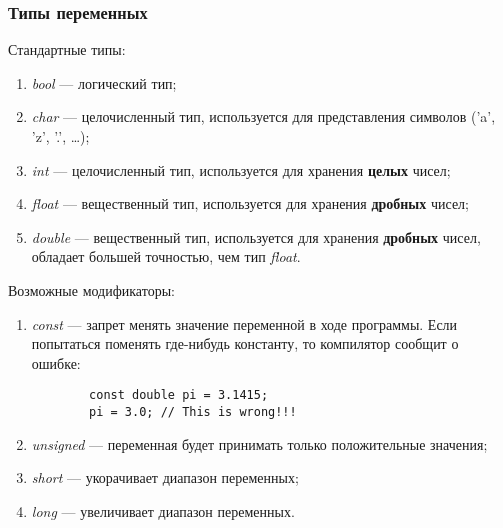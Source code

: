 \subsubsection{Типы переменных}
Стандартные типы:
\begin{enumerate}
    \item \textit{bool} --- логический тип;
    \item \textit{char} --- целочисленный тип, используется для представления символов ('a', 'z', '.', \ldots);
    \item \textit{int} --- целочисленный тип, используется для хранения \textbf{целых} чисел;
    \item \textit{float} --- вещественный тип, используется для хранения \textbf{дробных} чисел;
    \item \textit{double} --- вещественный тип, используется для хранения \textbf{дробных} чисел, обладает большей точностью, чем тип \textit{float}.
\end{enumerate}

Возможные модификаторы:
\begin{enumerate}
    \item \textit{const} --- запрет менять значение переменной в ходе программы. Если попытаться поменять где-нибудь константу, то компилятор сообщит о ошибке:
    \begin{lstlisting}
        const double pi = 3.1415;
        pi = 3.0; // This is wrong!!!
    \end{lstlisting}
    \item \textit{unsigned} --- переменная будет принимать только положительные значения;
    \item \textit{short} --- укорачивает диапазон переменных;
    \item \textit{long} --- увеличивает диапазон переменных.
\end{enumerate}

